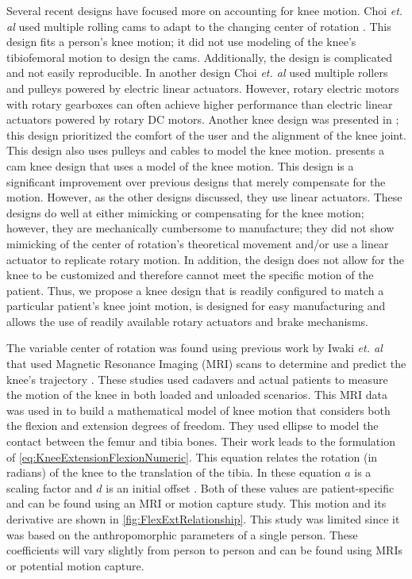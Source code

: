 Several recent designs have focused more on accounting for knee motion. Choi \textit{et. al} used multiple rolling cams to adapt to the changing center of rotation \cite{choi2017development}. This design fits a person's knee motion; it did not use modeling of the knee's tibiofemoral motion to design the cams. Additionally, the design is complicated and not easily reproducible. In another design Choi \textit{et. al} used multiple rollers and pulleys powered by electric linear actuators. However, rotary electric motors with rotary gearboxes can often achieve higher performance than electric linear actuators powered by rotary DC motors. Another knee design was presented in \cite{wang2018comfort}; this design prioritized the comfort of the user and the alignment of the knee joint. This design also uses pulleys and cables to model the knee motion. \cite{AdaptiveKneeJoint} presents a cam knee design that uses a model of the knee motion. This design is a significant improvement over previous designs that merely compensate for the motion. However, as the other designs discussed, they use linear actuators. These designs do well at either mimicking or compensating for the knee motion; however, they are mechanically cumbersome to manufacture; they did not show mimicking of the center of rotation's theoretical movement and/or use a linear actuator to replicate rotary motion. In addition, the design does not allow for the knee to be customized and therefore cannot meet the specific motion of the patient. Thus, we propose a knee design that is readily configured to match a particular patient's knee joint motion, is designed for easy manufacturing and allows the use of readily available rotary actuators and brake mechanisms.

The variable center of rotation was found using previous work by Iwaki \textit{et. al} that used Magnetic Resonance Imaging (MRI) scans to determine and predict the knee's trajectory \cite{MRIKneeShape_Loaded, MRIKneeShape_Unloaded}. These studies used cadavers and actual patients to measure the motion of the knee in both loaded and unloaded scenarios. This MRI data was used in \cite{KinDynKneeJoint} to build a mathematical model of knee motion that considers both the flexion and extension degrees of freedom. They used ellipse to model the contact between the femur and tibia bones. Their work leads to the formulation of \autoref{eq:KneeExtensionFlexionNumeric}. This equation relates the rotation (in radians) of the knee to the translation of the tibia. In these equation $a$ is a scaling factor and $d$ is an initial offset \cite{wang2013adaptive}. Both of these values are patient-specific and can be found using an MRI or motion capture study. This motion and its derivative are shown in \autoref{fig:FlexExtRelationship}. This study was limited since it was based on the anthropomorphic parameters of a single person. These coefficients will vary slightly from person to person and can be found using MRIs or potential motion capture. 

